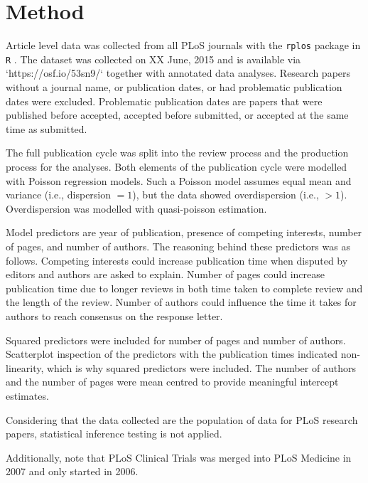 \section*{Method}
Article level data was collected from all PLoS journals with the \texttt{rplos} package \cite[v0.4.7][]{rplos} in \texttt{R} \cite[v3.2.0][]{rcran}. The dataset was collected on XX June, 2015 and is available via `https://osf.io/53sn9/` together with annotated data analyses. Research papers without a journal name, or publication dates, or had problematic publication dates were excluded. Problematic publication dates are papers that were published before accepted, accepted before submitted, or accepted at the same time as submitted.

The full publication cycle was split into the review process and the production process for the analyses. Both elements of the publication cycle were modelled with Poisson regression models. Such a Poisson model assumes equal mean and variance (i.e., dispersion $=1$), but the data showed overdispersion (i.e., $>1$). Overdispersion was modelled with quasi-poisson estimation.

Model predictors are year of publication, presence of competing interests, number of pages, and number of authors. The reasoning behind these predictors was as follows. Competing interests could increase publication time when disputed by editors and authors are asked to explain. Number of pages could increase publication time due to longer reviews in both time taken to complete review and the length of the review. Number of authors could influence the time it takes for authors to reach consensus on the response letter. 

Squared predictors were included for number of pages and number of authors. Scatterplot inspection of the predictors with the publication times indicated non-linearity, which is why squared predictors were included. The number of authors and the number of pages were mean centred to provide meaningful intercept estimates.

Considering that the data collected are the population of data for PLoS research papers, statistical inference testing is not applied.

Additionally, note that PLoS Clinical Trials was merged into PLoS Medicine in 2007 and only started in 2006.